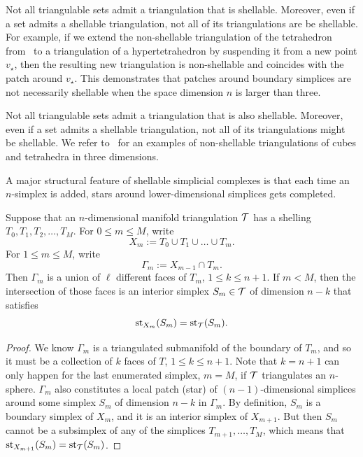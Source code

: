 \documentclass[10pt,letterpaper]{article}
\begin{document}
\begin{remark}
    Not all triangulable sets admit a triangulation that is shellable. 
    Moreover, even if a set admits a shellable triangulation, not all of its triangulations are be shellable. For example, if we extend the non-shellable triangulation of the tetrahedron from~\cite[Example 8.9]{ziegler1995lectures} to a triangulation of a hypertetrahedron by suspending it from a new point $v_\star$, then the resulting new triangulation is non-shellable and coincides with the patch around $v_\star$.
    This demonstrates that patches around boundary simplices are not necessarily shellable when the space dimension $n$ is larger than three.
\end{remark}
\begin{remark}
    Not all triangulable sets admit a triangulation that is also shellable. 
    Moreover, even if a set admits a shellable triangulation, not all of its triangulations might be shellable. 
    We refer to~\cite[Example 8.9]{ziegler1995lectures} for an examples of non-shellable triangulations of cubes and tetrahedra in three dimensions. 
\end{remark}


A major structural feature of shellable simplicial complexes is that each time an $n$-simplex is added, stars around lower-dimensional simplices gets completed. 

\begin{lemma}\label{lemma:existenceofstar}
    Suppose that an $n$-dimensional manifold triangulation ${\mathcal T}$ has a shelling $T_{0}, T_{1}, T_{2}, \dots, T_{M}$.
    For $0 \leq m \leq M$, write 
    $$
        X_{m} := T_{0} \cup T_{1} \cup \dots \cup T_{m}.
    $$ 
    For $1 \leq m \leq M$, write 
    $$
        \Gamma_{m} := X_{m-1} \cap T_{m}.
    $$ 
    Then $\Gamma_{m}$ is a union of $\ell$ different faces of $T_{m}$, $1 \leq k \leq n+1$.
    If $m < M$, then the intersection of those faces is an interior simplex $S_{m} \in {\mathcal T}$ of dimension $n-k$ that satisfies 
    $$
        \operatorname{st}_{X_{m}}(S_{m}) = \operatorname{st}_{{\mathcal T}}(S_{m}).
    $$
\end{lemma}
\begin{proof}
    We know $\Gamma_{m}$ is a triangulated submanifold of the boundary of $T_{m}$, 
    and so it must be a collection of $k$ faces of $T$, $1 \leq k \leq n+1$.
    Note that $k = n + 1$ can only happen for the last enumerated simplex, $m = M$, if ${\mathcal T}$ triangulates an $n$-sphere. 
    $\Gamma_{m}$ also constitutes a local patch (star) of $(n-1)$-dimensional simplices around some simplex $S_{m}$ of dimension $n-k$ in $\Gamma_{m}$.
    By definition, $S_{m}$ is a boundary simplex of $X_{m}$, 
    and it is an interior simplex of $X_{m+1}$. 
    But then $S_{m}$ cannot be a subsimplex of any of the simplices $T_{m+1}, \dots, T_{M}$,
    which means that $\operatorname{st}_{X_{m+1}}(S_{m}) = \operatorname{st}_{{\mathcal T}}(S_{m})$. 
\end{proof}
\end{document}

